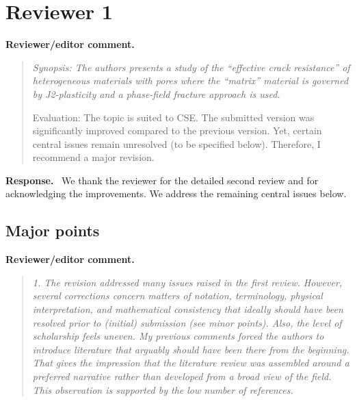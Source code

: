 \documentclass[pdflatex,sn-mathphys-num]{sn-jnl}
\newenvironment{reviewercomment}
  {\par\noindent\textbf{Reviewer/editor comment.}\begin{quote}\itshape}
  {\end{quote}}
\newenvironment{response}
  {\par\noindent\textbf{Response.}\ }
  {\par}
\begin{document}
\section*{Reviewer 1}

\begin{reviewercomment}
Synopsis: The authors presents a study of the ``effective crack resistance'' of heterogeneous materials with pores where
the ``matrix'' material is governed by J2-plasticity and a phase-field fracture approach is used.

Evaluation: The topic is suited to CSE. The submitted version was significantly improved compared to the previous
version. Yet, certain central issues remain unresolved (to be specified below). Therefore, I recommend a major revision.
\end{reviewercomment}

\begin{response}
We thank the reviewer for the detailed second review and for acknowledging the improvements. We address the remaining
central issues below.
\end{response}

\subsection*{Major points}

\begin{reviewercomment}
1. The revision addressed many issues raised in the first review. However, several corrections concern matters of
notation, terminology, physical interpretation, and mathematical consistency that ideally should have been resolved
prior to (initial) submission (see minor points). Also, the level of scholarship feels uneven. My previous comments
forced the authors to introduce literature that arguably should have been there from the beginning. That gives the
impression that the literature review was assembled around a preferred narrative rather than developed from a broad
view of the field. This observation is supported by the low number of references.
\end{reviewercomment}
\end{document}
